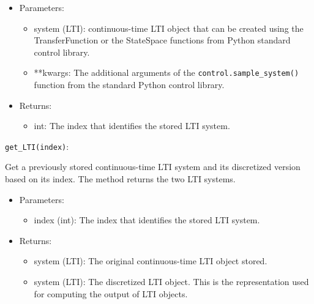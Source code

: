 \documentclass[12pt]{report}
\begin{document}
\begin{itemize}
\begin{itemize}
\item Parameters:

\begin{itemize}

\item system (LTI): continuous-time LTI object that can be created using the TransferFunction or the StateSpace functions from Python standard control library.

\item **kwargs: The additional arguments of the \texttt{control.sample\_system()} function from the standard Python control library.

\end{itemize}

\item Returns:

\begin{itemize}

\item int: The index that identifies the stored LTI system.

\end{itemize}

\end{itemize}

\texttt{get\_LTI(index)}:

Get a previously stored continuous-time LTI system and its discretized version based on its index. The method returns the two LTI systems.

\begin{itemize}
\item Parameters:

\begin{itemize}
\item index (int): The index that identifies the stored LTI system.
\end{itemize}

\item Returns:

\begin{itemize}

\item system (LTI): The original continuous-time LTI object stored.

\item system (LTI): The discretized LTI object. This is the representation used for computing the output of LTI objects.

\end{itemize}

\end{itemize}

\end{itemize}
\end{document}
